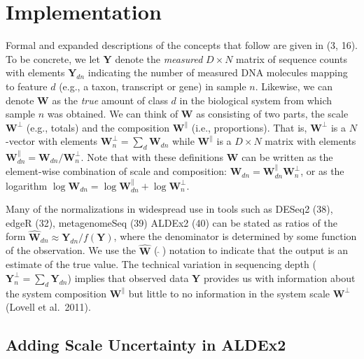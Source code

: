 \documentclass[
]{article}
\begin{document}
\section{Implementation}\label{implementation}

Formal and expanded descriptions of the concepts that follow are given
in (3, 16). To be concrete, we let \(\mathbf{Y}\) denote the
\emph{measured} \(D \times N\) matrix of sequence counts with elements
\(\mathbf{Y}_{dn}\) indicating the number of measured DNA molecules
mapping to feature \(d\) (e.g., a taxon, transcript or gene) in sample
\(n\). Likewise, we can denote \(\mathbf{W}\) as the \emph{true} amount
of class \(d\) in the biological system from which sample \(n\) was
obtained. We can think of \(\mathbf{W}\) as consisting of two parts, the
scale \(\mathbf{W}^{\perp}\) (e.g., totals) and the composition
\(\mathbf{W}^{\parallel}\) (i.e., proportions). That is,
\(\mathbf{W}^{\perp}\) is a \(N\)-vector with elements
\(\mathbf{W}^{\perp}_{n}=\sum_{d}\mathbf{W}_{dn}\) while
\(\mathbf{W}^{\parallel}\) is a \(D \times N\) matrix with elements
\(\mathbf{W}^{\parallel}_{dn}=\mathbf{W}_{dn}/\mathbf{W}^{\perp}_{n}\).
Note that with these definitions \(\mathbf{W}\) can be written as the
element-wise combination of scale and composition:
\(\mathbf{W}_{dn}=\mathbf{W}^{\parallel}_{dn}\mathbf{W}^{\perp}_{n}\),
or as the logarithm
\(\log \mathbf{W}_{dn}= \log \mathbf{W}^{\parallel}_{dn} + \log \mathbf{W}^{\perp}_{n}\).

Many of the normalizations in widespread use in tools such as DESeq2
(38), edgeR (32), metagenomeSeq (39) ALDEx2 (40) can be stated as ratios
of the form
\(\hat{{\mathbf{W}}}_{dn} \approx \mathbf{Y}_{dn}/f(\mathbf{Y})\), where
the denominator is determined by some function of the observation. We
use the \(\hat{{\mathbf{W}}}\) (\(\ \hat{}\ \)) notation to indicate
that the output is an estimate of the true value. The technical
variation in sequencing depth
(\(\mathbf{Y}^{\perp}_{n}=\sum_{d}\mathbf{Y}_{dn}\)) implies that
observed data \(\mathbf{Y}\) provides us with information about the
system composition \(\mathbf{W}^{\parallel}\) but little to no
information in the system scale \(\mathbf{W}^{\perp}\) (Lovell et
al.~2011).

\subsection{Adding Scale Uncertainty in
ALDEx2}\label{adding-scale-uncertainty-in-aldex2}
\end{document}
